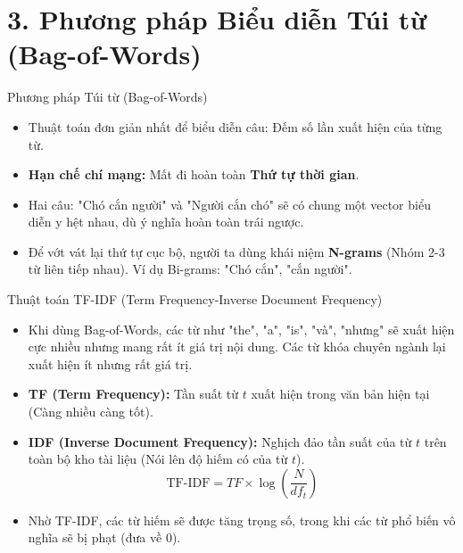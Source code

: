 \documentclass[aspectratio=169]{beamer}
\begin{document}
\section{3. Phương pháp Biểu diễn Túi từ (Bag-of-Words)}

\begin{frame}{Phương pháp Túi từ (Bag-of-Words)}
    \begin{itemize}
        \item Thuật toán đơn giản nhất để biểu diễn câu: Đếm số lần xuất hiện của từng từ.
        \item \textbf{Hạn chế chí mạng:} Mất đi hoàn toàn \textbf{Thứ tự thời gian}. 
        \item Hai câu: "Chó cắn người" và "Người cắn chó" sẽ có chung một vector biểu diễn y hệt nhau, dù ý nghĩa hoàn toàn trái ngược.
        \item Để vớt vát lại thứ tự cục bộ, người ta dùng khái niệm \textbf{N-grams} (Nhóm 2-3 từ liên tiếp nhau). Ví dụ Bi-grams: "Chó cắn", "cắn người".
    \end{itemize}
\end{frame}

\begin{frame}{Thuật toán TF-IDF (Term Frequency-Inverse Document Frequency)}
    \begin{itemize}
        \item Khi dùng Bag-of-Words, các từ như "the", "a", "is", "và", "nhưng" sẽ xuất hiện cực nhiều nhưng mang rất ít giá trị nội dung. Các từ khóa chuyên ngành lại xuất hiện ít nhưng rất giá trị.
        \item \textbf{TF (Term Frequency):} Tần suất từ $t$ xuất hiện trong văn bản hiện tại (Càng nhiều càng tốt).
        \item \textbf{IDF (Inverse Document Frequency):} Nghịch đảo tần suất của từ $t$ trên toàn bộ kho tài liệu (Nói lên độ hiếm có của từ $t$).
        $$ \text{TF-IDF} = TF \times \log\left(\frac{N}{df_t}\right) $$
        \item Nhờ TF-IDF, các từ hiếm sẽ được tăng trọng số, trong khi các từ phổ biến vô nghĩa sẽ bị phạt (đưa về $0$).
    \end{itemize}
\end{frame}
\end{document}
